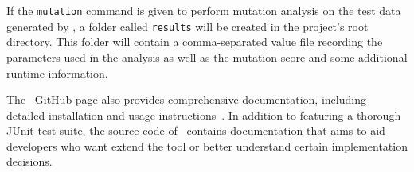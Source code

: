 If the \lstinline{mutation} command is given to perform mutation analysis on the test data generated by \sa, a folder
called \lstinline{results} will be created in the project's root directory. This folder will contain a comma-separated
value file recording the parameters used in the analysis as well as the mutation score and some additional runtime
information.


The \sa~GitHub page also provides comprehensive documentation, including detailed installation and usage
instructions~\cite{tool}. In addition to featuring a thorough JUnit test suite, the source code of \sa~contains
documentation that aims to aid developers who want extend the tool or better understand certain implementation
decisions.




